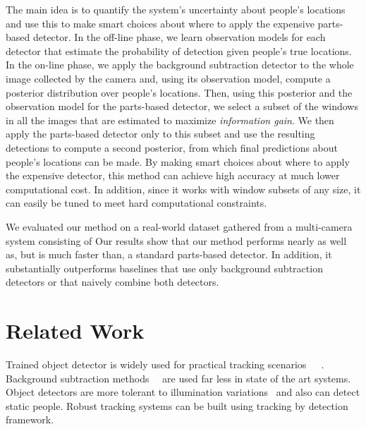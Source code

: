 \documentclass[10pt,twocolumn,letterpaper]{article}
\begin{document}
The main idea is to quantify the system's uncertainty about people's locations and use this to make smart choices about where to apply the expensive parts-based detector.  In the off-line phase, we learn observation models for each detector that estimate the probability of detection given people's true locations.  In the on-line phase, we apply the background subtraction detector to the whole image collected by the camera and, using its observation model, compute a posterior distribution over people's locations.  Then, using this posterior and the observation model for the parts-based detector, we select a subset of the windows in all the images that are estimated to maximize \emph{information gain}.  We then apply the parts-based detector only to this subset and use the resulting detections to compute a second posterior, from which final predictions about people's locations can be made.  By making smart choices about where to apply the expensive detector, this method can achieve high accuracy at much lower computational cost.  In addition, since it works with window subsets of any size, it can easily be tuned to meet hard computational constraints.  

We evaluated our method on a real-world dataset gathered from a multi-camera system  consisting of   Our results show that our method performs nearly as well as, but is much faster than, a standard parts-based detector.  In addition, it substantially outperforms baselines that use only background subtraction detectors or that naively combine both detectors.

\section {Related Work} 

Trained object detector is widely used for practical tracking scenarios~\cite{Pami-11}~\cite{POM-main}~\cite{MIL-obj1}. Background subtraction methods~\cite{bk1}~\cite{bk2-bayesian} are used far less in state of the art systems. Object detectors are more tolerant to illumination variations~\cite{ObjDet-1} and also can detect static people. Robust tracking systems can be built using  tracking by detection framework.
\end{document}
